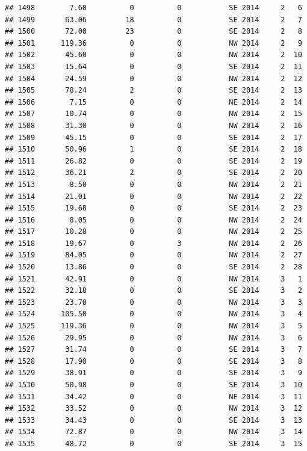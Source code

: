 \documentclass[
]{article}
\begin{document}
\begin{verbatim}
## 1498        7.60          0          0           SE 2014     2   6
## 1499       63.06         18          0           SE 2014     2   7
## 1500       72.00         23          0           SE 2014     2   8
## 1501      119.36          0          0           NW 2014     2   9
## 1502       45.60          0          0           NW 2014     2  10
## 1503       15.64          0          0           SE 2014     2  11
## 1504       24.59          0          0           NW 2014     2  12
## 1505       78.24          2          0           SE 2014     2  13
## 1506        7.15          0          0           NE 2014     2  14
## 1507       10.74          0          0           NW 2014     2  15
## 1508       31.30          0          0           NW 2014     2  16
## 1509       45.15          0          0           SE 2014     2  17
## 1510       50.96          1          0           SE 2014     2  18
## 1511       26.82          0          0           SE 2014     2  19
## 1512       36.21          2          0           SE 2014     2  20
## 1513        8.50          0          0           NW 2014     2  21
## 1514       21.01          0          0           NW 2014     2  22
## 1515       19.68          0          0           SE 2014     2  23
## 1516        8.05          0          0           NW 2014     2  24
## 1517       10.28          0          0           NW 2014     2  25
## 1518       19.67          0          3           NW 2014     2  26
## 1519       84.05          0          0           NW 2014     2  27
## 1520       13.86          0          0           SE 2014     2  28
## 1521       42.91          0          0           NW 2014     3   1
## 1522       32.18          0          0           SE 2014     3   2
## 1523       23.70          0          0           NW 2014     3   3
## 1524      105.50          0          0           NW 2014     3   4
## 1525      119.36          0          0           NW 2014     3   5
## 1526       29.95          0          0           NW 2014     3   6
## 1527       31.74          0          0           SE 2014     3   7
## 1528       17.90          0          0           SE 2014     3   8
## 1529       38.91          0          0           SE 2014     3   9
## 1530       50.98          0          0           SE 2014     3  10
## 1531       34.42          0          0           NE 2014     3  11
## 1532       33.52          0          0           NW 2014     3  12
## 1533       34.43          0          0           SE 2014     3  13
## 1534       72.87          0          0           NW 2014     3  14
## 1535       48.72          0          0           SE 2014     3  15

\end{verbatim}
\end{document}
